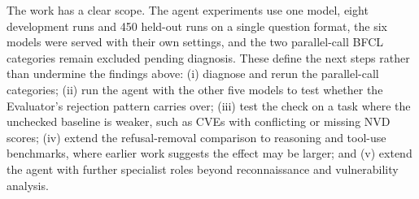 \documentclass[conference]{IEEEtran}
\begin{document}
The work has a clear scope. The agent experiments use one model, eight development runs and 450 held-out
runs on a single question format, the six models were served with their own settings, and the
two parallel-call BFCL categories remain excluded pending diagnosis. These
define the next steps rather than undermine the findings above:
(i) diagnose and rerun the parallel-call categories;
(ii) run the agent with the other five models to test whether the Evaluator's
rejection pattern carries over;
(iii) test the check on a task where the unchecked baseline is weaker, such as
CVEs with conflicting or missing NVD scores;
(iv) extend the refusal-removal comparison to reasoning and tool-use
benchmarks, where earlier work suggests the effect may be larger; and
(v) extend the agent with further specialist roles beyond reconnaissance
and vulnerability analysis.
\end{document}
